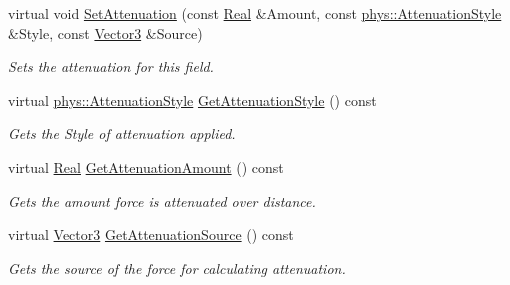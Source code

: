 \begin{DoxyCompactItemize}
virtual void \hyperlink{classphys_1_1FieldOfForce_a62c35223c61405fac5f2e3ccaf6cd3e8}{SetAttenuation} (const \hyperlink{namespacephys_af7eb897198d265b8e868f45240230d5f}{Real} \&Amount, const \hyperlink{namespacephys_ad4ce7ee5c1cc164f2ea3d5f28211739f}{phys::AttenuationStyle} \&Style, const \hyperlink{classphys_1_1Vector3}{Vector3} \&Source)
\begin{DoxyCompactList}\small\item\em Sets the attenuation for this field. \item\end{DoxyCompactList}\item 
virtual \hyperlink{namespacephys_ad4ce7ee5c1cc164f2ea3d5f28211739f}{phys::AttenuationStyle} \hyperlink{classphys_1_1FieldOfForce_adebea1a14be7602fe358586890372211}{GetAttenuationStyle} () const 
\begin{DoxyCompactList}\small\item\em Gets the Style of attenuation applied. \item\end{DoxyCompactList}\item 
virtual \hyperlink{namespacephys_af7eb897198d265b8e868f45240230d5f}{Real} \hyperlink{classphys_1_1FieldOfForce_a172a581eb1db6269e62764389fbde98c}{GetAttenuationAmount} () const 
\begin{DoxyCompactList}\small\item\em Gets the amount force is attenuated over distance. \item\end{DoxyCompactList}\item 
virtual \hyperlink{classphys_1_1Vector3}{Vector3} \hyperlink{classphys_1_1FieldOfForce_a254e3ec97983aeeb9f3af7a656c9e7c5}{GetAttenuationSource} () const 
\begin{DoxyCompactList}\small\item\em Gets the source of the force for calculating attenuation. \item\end{DoxyCompactList}\end{DoxyCompactItemize}

